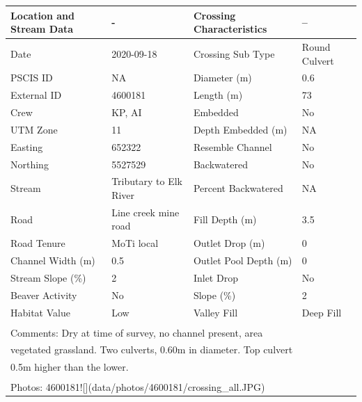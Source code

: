 \documentclass[
]{book}
\begin{document}
\begin{tabular}{llll}
\toprule
Location and Stream Data & - & Crossing Characteristics & --\\
\midrule
Date & 2020-09-18 & Crossing Sub Type & Round Culvert\\
PSCIS ID & NA & Diameter (m) & 0.6\\
External ID & 4600181 & Length (m) & 73\\
Crew & KP, AI & Embedded & No\\
UTM Zone & 11 & Depth Embedded (m) & NA\\
\addlinespace
Easting & 652322 & Resemble Channel & No\\
Northing & 5527529 & Backwatered & No\\
Stream & Tributary to Elk River & Percent Backwatered & NA\\
Road & Line creek mine road & Fill Depth (m) & 3.5\\
Road Tenure & MoTi local & Outlet Drop (m) & 0\\
\addlinespace
Channel Width (m) & 0.5 & Outlet Pool Depth (m) & 0\\
Stream Slope (\%) & 2 & Inlet Drop & No\\
Beaver Activity & No & Slope (\%) & 2\\
Habitat Value & Low & Valley Fill & Deep Fill\\
\bottomrule
\multicolumn{4}{l}{\textsuperscript{} Comments: Dry at time of survey, no channel present, area}\\
\multicolumn{4}{l}{vegetated grassland. Two culverts, 0.60m in diameter. Top culvert}\\
\multicolumn{4}{l}{0.5m higher than the lower.}\\
\multicolumn{4}{l}{\textsuperscript{} Photos: 4600181![](data/photos/4600181/crossing\_all.JPG)}\\
\end{tabular}
\end{document}
